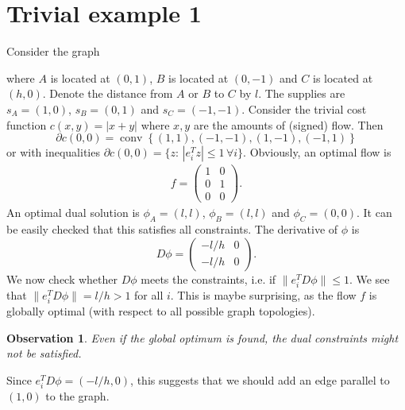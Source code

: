\documentclass[10pt,a4paper]{article}
\DeclareMathOperator{\conv}{conv}
\newtheorem{observation}{Observation}
\begin{document}
	\section{Trivial example 1}
	Consider the graph
\begin{center}
\end{center}
where $A$ is located at $(0,1)$, $B$ is located at $(0,-1)$ and $C$ is located at $(h,0)$. Denote the distance from $A$ or $B$ to $C$ by $l$. The supplies are $s_A = (1,0)$, $s_B = (0,1)$ and $s_C = (-1,-1)$. Consider the trivial cost function $c(x,y) = |x+y|$ where $x, y$ are the amounts of (signed) flow. Then
\[
\partial c(0,0) = \conv\left\{ (1,1),(-1,-1),(1,-1),(-1,1) \right\}
\]
or with inequalities $\partial c(0,0) = \{z:\, |e_i^T z| \leq 1 \,\forall i \}$. Obviously, an optimal flow is
\begin{align*}
f = \begin{pmatrix}
1&0\\0&1\\0&0
\end{pmatrix}.
\end{align*}
An optimal dual solution is $\phi_A = (l,l)$, $\phi_B = (l,l)$ and $\phi_C = (0,0)$. It can be easily checked that this satisfies all constraints. The derivative of $\phi$ is
\[
D\phi = \begin{pmatrix}
-l/h & 0\\-l/h & 0
\end{pmatrix}.
\]
We now check whether $D\phi$ meets the constraints, i.e. if $\lVert e_i^T D\phi \rVert\leq 1$. We see that $\lVert e_i^TD\phi \rVert = l/h > 1$ for all $i$. This is maybe surprising, as the flow $f$ is globally optimal (with respect to all possible graph topologies).
\begin{observation}
	Even if the global optimum is found, the dual constraints might not be satisfied.
\end{observation}
Since $e_i^T D\phi = (-l/h,0)$, this suggests that we should add an edge parallel to $(1,0)$ to the graph.
\end{document}

